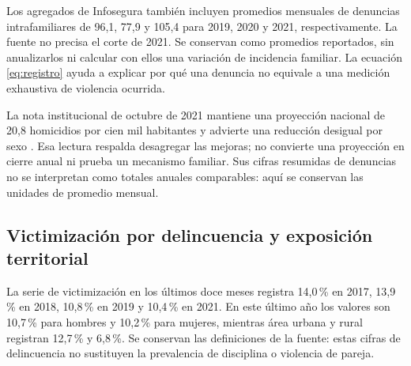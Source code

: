 Los agregados de Infosegura también incluyen promedios mensuales de denuncias
intrafamiliares de 96,1, 77,9 y 105,4 para 2019, 2020 y 2021, respectivamente.
La fuente no precisa el corte de 2021. Se conservan como promedios reportados,
sin anualizarlos ni calcular con ellos una variación de
incidencia familiar. La ecuación \ref{eq:registro} ayuda a explicar por qué
una denuncia no equivale a una medición exhaustiva de violencia ocurrida.

La nota institucional de octubre de 2021 mantiene una proyección nacional
de 20,8 homicidios por cien mil habitantes y advierte una reducción desigual
por sexo \citep{pnud2021octubre}. Esa lectura respalda desagregar las
mejoras; no convierte una proyección en cierre anual ni prueba un mecanismo
familiar. Sus cifras resumidas de denuncias no se interpretan como totales
anuales comparables: aquí se conservan las unidades de promedio mensual.

\subsection{Victimización por delincuencia y exposición territorial}
La serie de victimización en los últimos doce meses registra 14,0\,\%
en 2017, 13,9\,\% en 2018, 10,8\,\% en 2019 y 10,4\,\% en 2021. En este
último año los valores son 10,7\,\% para hombres y 10,2\,\% para mujeres,
mientras área urbana y rural registran 12,7\,\% y 6,8\,\%. Se conservan las
definiciones de la fuente: estas cifras de delincuencia no sustituyen
la prevalencia de disciplina o violencia de pareja.

